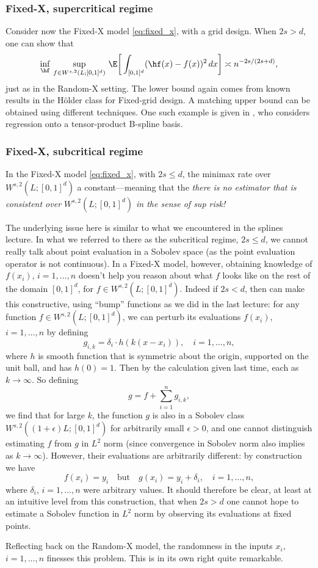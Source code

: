 \documentclass{article}
\begin{document}
\subsubsection{Fixed-X, supercritical regime}

Consider now the Fixed-X model \eqref{eq:fixed_x}, with a grid design. When $2s
> d$, one can show that
\[
\inf_{\hf} \, \sup_{f \in W^{s,2}(L; [0,1]^d)} \, \E \bigg[ \int_{[0,1]^d}
(\hf(x) - f(x))^2 \, dx \bigg] \asymp n^{-2s/(2s+d)},
\]
just as in the Random-X setting. The lower bound again comes from known results
in the H{\"o}lder class for Fixed-grid design. A matching upper bound can be
obtained using different techniques. One such example is given in
\citet{nussbaum1987nonparametric}, who considers regression onto a
tensor-product B-spline basis.   

\subsubsection{Fixed-X, subcritical regime}

In the Fixed-X model \eqref{eq:fixed_x}, with $2s \leq d$, the minimax rate over
$W^{s,2}(L; [0,1]^d)$ a constant---meaning that the \emph{there is no estimator
  that is consistent over $W^{s,2}(L; [0,1]^d)$ in the sense of sup risk!}

The underlying issue here is similar to what we encountered in the splines
lecture. In what we referred to there as the subcritical regime, $2s \leq d$, we
cannot really talk about point evaluation in a Sobolev space (as the point
evaluation operator is not continuous). In a Fixed-X model, however, obtaining
knowledge of $f(x_i)$, $i=1,\dots,n$ doesn't help you reason about what $f$
looks like on the rest of the domain $[0,1]^d$, for $f \in W^{s,2}(L;
[0,1]^d)$. Indeed if $2s < d$, then can make this constructive, using ``bump''
functions as we did in the last lecture: for any function $f \in W^{s,2}(L;
[0,1]^d)$, we can perturb its evaluations $f(x_i)$, $i=1,\dots,n$ by defining  
\[
g_{i,k} = \delta_i \cdot h(k(x-x_i)), \quad i=1,\dots,n, 
\]
where $h$ is smooth function that is symmetric about the origin, supported on
the unit ball, and has $h(0) = 1$. Then by the calculation given last time, each 
 as $k \to \infty$. So defining
\[
g = f + \sum_{i=1}^n g_{i,k},
\]
we find that for large $k$, the function $g$ is also in a Sobolev class
$W^{s,2}((1+\epsilon) L; [0,1]^d)$ for arbitrarily small $\epsilon>0$, and one
cannot distinguish estimating $f$ from $g$ in $L^2$ norm (since convergence in 
Sobolev norm also implies  as $k \to 
\infty$). However, their evaluations are arbitrarily different: by construction
we have 
\[
f(x_i) = y_i \quad \text{but} \quad g(x_i) = y_i + \delta_i, \quad i =
1,\dots,n, 
\]
where $\delta_i$, $i=1,\dots,n$ were arbitrary values. It should therefore be
clear, at least at an intuitive level from this construction, that when $2s > d$
one cannot hope to estimate a Sobolev function in $L^2$ norm by observing 
its evaluations at fixed points.     

Reflecting back on the Random-X model, the randomness in the inputs $x_i$,
$i=1,\dots,n$ finesses this problem. This is in its own right quite
remarkable. 



\end{document}
